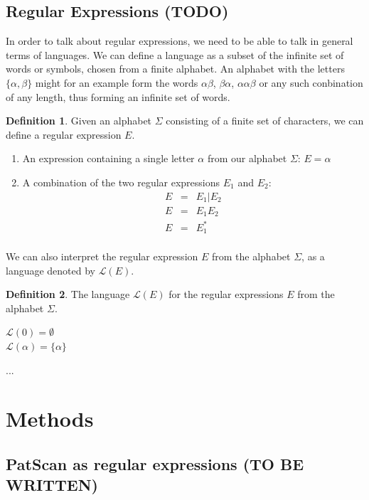 \documentclass[12pt]{article}
\theoremstyle{definition}
\newtheorem{mydef}{Definition}
\begin{document}
\subsection{Regular Expressions (TODO)}

In order to talk about regular expressions, we need to be able to talk in general terms of languages. We can define a language as a subset of the infinite set of words or symbols, chosen from a finite alphabet. An alphabet with the letters $\{\alpha, \beta\}$ might for an example form the words $\alpha\beta$, $\beta\alpha$, $\alpha\alpha\beta$ or any such conbination of any length, thus forming an infinite set of words.\\

\begin{mydef} Given an alphabet $\Sigma$ consisting of a finite set of characters, we can define a regular expression $E$.
	\begin{enumerate}
		\item An expression containing a single letter $\alpha$ from our alphabet $\Sigma$: $E = \alpha$
		
		\item A combination of the two regular expressions $E_1$ and $E_2$:
		\begin{eqnarray}
			E &=& E_1 | E_2 \\
			E &=& E_1E_2 \\
			E &=& E_1^* \\
		\end{eqnarray}
	\end{enumerate}	
\end{mydef} 

We can also interpret the regular expression $E$ from the alphabet $\Sigma$, as a language denoted by $\mathcal{L}(E)$. \\

\begin{mydef} The language $\mathcal{L}(E)$ for the regular expressions $E$ from the alphabet $\Sigma$.

	$\mathcal{L}(0) = \emptyset$\\
	$\mathcal{L}(\alpha) = \{\alpha\}$
\end{mydef}

... 

\newpage

\section{Methods}
\subsection{PatScan as regular expressions (TO BE WRITTEN)}
\end{document}
